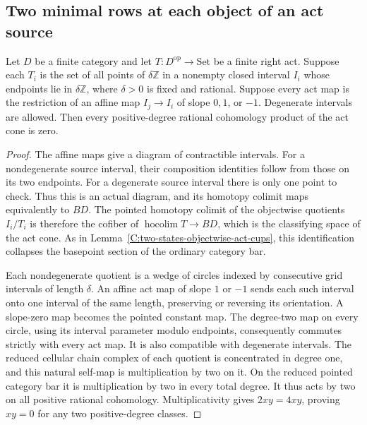 \subsection{Two minimal rows at each object of an act source}

\begin{lemma}
\label{C:categorical-grid-act-cups}
Let $D$ be a finite category and let $T:D^{\mathrm{op}}\to\mathrm{Set}$
be a finite right act. Suppose each $T_i$ is the set of all points
of $\delta\mathbb Z$ in a nonempty closed interval $I_i$ whose
endpoints lie in $\delta\mathbb Z$, where $\delta>0$ is fixed and rational. Suppose every act map is the
restriction of an affine map $I_j\to I_i$ of slope $0,1$, or $-1$.
Degenerate intervals are allowed. Then every positive-degree
rational cohomology product of the act cone is zero.
\end{lemma}
\begin{proof}
The affine maps give a diagram of contractible intervals.
For a nondegenerate source interval, their composition identities
follow from those on its two endpoints. For a degenerate source
interval there is only one point to check. Thus this is an actual
diagram, and its homotopy colimit maps equivalently to $BD$.
The pointed homotopy colimit of the objectwise quotients $I_i/T_i$
is therefore the cofiber of $\operatorname{hocolim}T\to BD$,
which is the classifying space of the act cone. As in
Lemma~\ref{C:two-states-objectwise-act-cups}, this identification
collapses the basepoint section of the ordinary category bar.

Each nondegenerate quotient is a wedge of circles indexed by
consecutive grid intervals of length $\delta$. An affine act map
of slope $1$ or $-1$ sends each such interval onto one interval
of the same length, preserving or reversing its orientation.
A slope-zero map becomes the pointed constant map. The
degree-two map on every circle, using its interval parameter
modulo endpoints, consequently commutes strictly with every act
map. It is also compatible with degenerate intervals.
The reduced cellular chain complex of each quotient is concentrated
in degree one, and this natural self-map is multiplication by two
on it. On the reduced pointed category bar it is multiplication
by two in every total degree. It thus acts by two on all positive
rational cohomology. Multiplicativity gives $2xy=4xy$, proving
$xy=0$ for any two positive-degree classes.
\end{proof}

